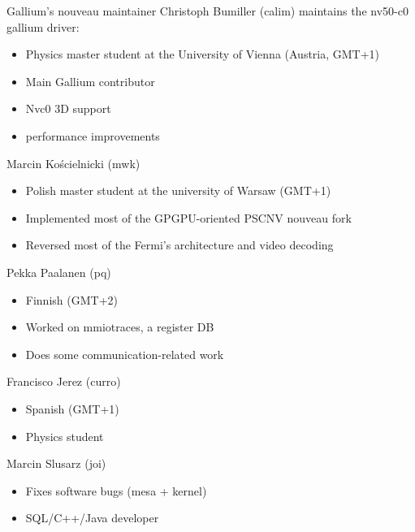 \documentclass[11pt,english,compress]{beamer}
\begin{document}
		\begin{frame}
			\begin{block}{Gallium's nouveau maintainer}
				Christoph Bumiller (calim) maintains the nv50-c0 gallium driver:
				\begin{itemize}
					\item Physics master student at the University of Vienna (Austria, GMT+1)
					\item Main Gallium contributor
					\item Nvc0 3D support
					\item performance improvements
				\end{itemize}
			\end{block}

			\begin{block}{Marcin Kościelnicki (mwk)}
				\begin{itemize}
					\item Polish master student at the university of Warsaw (GMT+1)
					\item Implemented most of the GPGPU-oriented PSCNV nouveau fork
					\item Reversed most of the Fermi's architecture and video decoding
				\end{itemize}
			\end{block}
		\end{frame}

		\begin{frame}
			\begin{block}{Pekka Paalanen (pq)}
				\begin{itemize}
					\item Finnish (GMT+2)
					\item Worked on mmiotraces, a register DB
					\item Does some communication-related work
				\end{itemize}
			\end{block}

			\begin{block}{Francisco Jerez (curro)}
				\begin{itemize}
					\item Spanish (GMT+1)
					\item Physics student
				\end{itemize}
			\end{block}

			\begin{block}{Marcin Slusarz (joi)}
				\begin{itemize}
					\item Fixes software bugs (mesa + kernel)
					\item SQL/C++/Java developer
				\end{itemize}
			\end{block}
		\end{frame}
\end{document}
